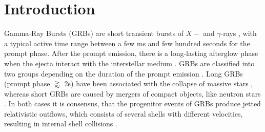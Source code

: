 \documentclass[twocolumn,traditabstract]{aa}
\begin{document}


\maketitle

\section{Introduction}

Gamma-Ray Bursts (GRBs) are short transient bursts of $X-$ and $\gamma$-rays \citep{Klebesadel+1973}, with a typical active time range between a few ms and few hundred seconds for the prompt phase.
After the prompt emission, there is a long-lasting afterglow phase when the ejecta interact with the interstellar medium \citep{MeszarosRees1997, afterglow}. GRBs are classified into two groups depending on the duration of the prompt emission \citep{shortlong}. Long GRBs (prompt phase $\gtrapprox$ 2s) have been associated with the collapse of massive stars \citep{SN1, Hjorth+2003, SN2}, whereas short GRBs are  caused by mergers of compact objects, like neutron stars \citep{Eichler+1989, gw}. In both cases it is consensus, that the progenitor events of GRBs produce jetted relativistic outflows, which consists of several shells with different velocities, resulting in internal shell collisions \citep{ReesMeszaros1994, Mochkovitch+1995}.
\end{document}
